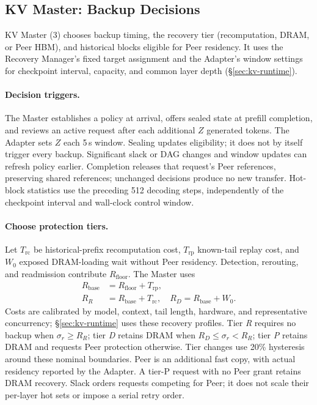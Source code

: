 \subsection{KV Master: Backup Decisions}
\label{sec:kv-placement}
\label{sec:kv-master}

KV Master (3) chooses backup timing, the recovery tier (recomputation,
DRAM, or Peer HBM), and historical blocks eligible for Peer residency.
It uses the Recovery Manager's fixed target assignment and the Adapter's
window settings for checkpoint interval, capacity, and common layer
depth (\S\ref{sec:kv-runtime}).

\paragraph{Decision triggers.}
The Master establishes a policy at arrival, offers sealed state at
prefill completion, and reviews an active request after each additional
$Z$ generated tokens. The Adapter sets $Z$ each 5\,s window. Sealing
updates eligibility; it does not by itself trigger every backup.
Significant slack or DAG changes and window updates can refresh policy
earlier. Completion releases that request's Peer references, preserving
shared references; unchanged decisions produce no new transfer.
Hot-block statistics use the preceding 512 decoding steps, independently
of the checkpoint interval and wall-clock control window.

\paragraph{Choose protection tiers.}
Let $T_{\mathrm{rc}}$ be historical-prefix recomputation cost,
$T_{\mathrm{rp}}$ known-tail replay cost, and $W_0$ exposed DRAM-loading
wait without Peer residency. Detection, rerouting, and readmission
contribute $R_{\mathrm{floor}}$. The Master uses
\begin{equation}
\begin{aligned}
 R_{\mathrm{base}}&=R_{\mathrm{floor}}+T_{\mathrm{rp}},\\
 R_R&=R_{\mathrm{base}}+T_{\mathrm{rc}},\quad
 R_D=R_{\mathrm{base}}+W_0.
\end{aligned}
\label{eq:recovery-base}
\end{equation}
Costs are calibrated by model, context, tail length, hardware, and
representative concurrency; \S\ref{sec:kv-runtime} uses these recovery profiles.
Tier \emph{R} requires no backup when $\sigma_r\ge R_R$;
tier \emph{D} retains DRAM when $R_D\le\sigma_r<R_R$;
tier \emph{P} retains DRAM and requests Peer protection otherwise.
Tier changes use 20\% hysteresis around these nominal boundaries.
Peer is an additional fast copy, with actual residency reported by
the Adapter. A tier-P request with no Peer grant retains DRAM recovery.
Slack orders requests competing for Peer; it does not scale their
per-layer hot sets or impose a serial retry order.

